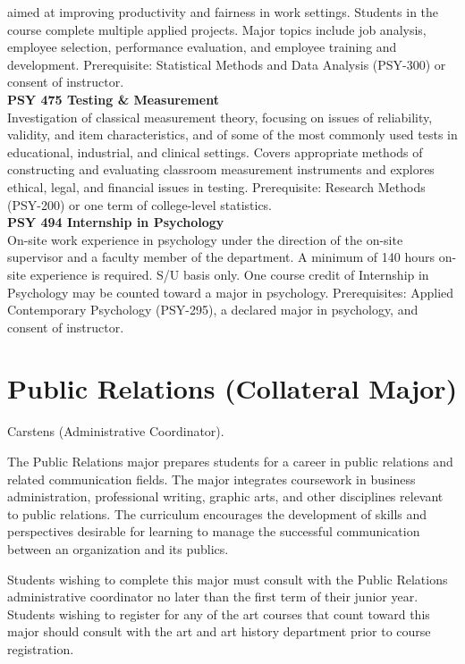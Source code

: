 \documentclass[
  letterpaper,
]{scrbook}
\begin{document}
aimed at improving productivity and fairness in work settings. Students
in the course complete multiple applied projects. Major topics include
job analysis, employee selection, performance evaluation, and employee
training and development. Prerequisite: Statistical Methods and Data
Analysis (PSY-300) or consent of instructor.\\
\textbf{PSY 475 Testing \& Measurement}\\
Investigation of classical measurement theory, focusing on issues of
reliability, validity, and item characteristics, and of some of the most
commonly used tests in educational, industrial, and clinical settings.
Covers appropriate methods of constructing and evaluating classroom
measurement instruments and explores ethical, legal, and financial
issues in testing. Prerequisite: Research Methods (PSY-200) or one term
of college-level statistics.\\
\textbf{PSY 494 Internship in Psychology}\\
On-site work experience in psychology under the direction of the on-site
supervisor and a faculty member of the department. A minimum of 140
hours on-site experience is required. S/U basis only. One course credit
of Internship in Psychology may be counted toward a major in psychology.
Prerequisites: Applied Contemporary Psychology (PSY-295), a declared
major in psychology, and consent of instructor.

\section{Public Relations (Collateral
Major)}\label{public-relations-collateral-major}

Carstens (Administrative Coordinator).

The Public Relations major prepares students for a career in public
relations and related communication fields. The major integrates
coursework in business administration, professional writing, graphic
arts, and other disciplines relevant to public relations. The curriculum
encourages the development of skills and perspectives desirable for
learning to manage the successful communication between an organization
and its publics.

Students wishing to complete this major must consult with the Public
Relations administrative coordinator no later than the first term of
their junior year. Students wishing to register for any of the art
courses that count toward this major should consult with the art and art
history department prior to course registration.
\end{document}
